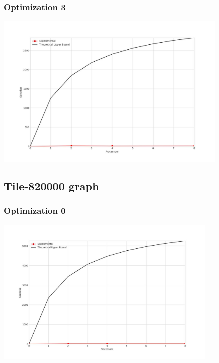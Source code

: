 \subsubsection{Optimization 3}
\begin{center}
    \resizebox{0.95\textwidth}{!}{}
    \includegraphics[width=0.84\textwidth]{../img/speedup-graph_type-tile-410000-O3}
\end{center}

\clearpage
\subsection{Tile-820000 graph}
\subsubsection{Optimization 0}
\begin{center}
    \resizebox{0.95\textwidth}{!}{}
    \includegraphics[width=0.8\textwidth]{../img/speedup-graph_type-tile-820000-O0}
\end{center}

